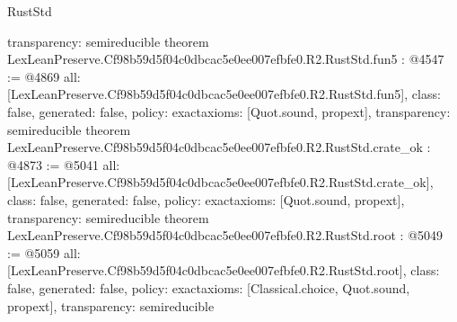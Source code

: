 \begin{lexlean}{RustStd}
\begin{coremodule}
{  transparency: semireducible
}
theorem LexLeanPreserve.Cf98b59d5f04c0dbcac5e0ee007efbfe0.R2.RustStd.fun5 : @4547 := @4869 {
  all: [LexLeanPreserve.Cf98b59d5f04c0dbcac5e0ee007efbfe0.R2.RustStd.fun5],
  class: false,
  generated: false,
  policy: exact{axioms: [Quot.sound, propext]},
  transparency: semireducible
}
theorem LexLeanPreserve.Cf98b59d5f04c0dbcac5e0ee007efbfe0.R2.RustStd.crate_ok : @4873 := @5041 {
  all: [LexLeanPreserve.Cf98b59d5f04c0dbcac5e0ee007efbfe0.R2.RustStd.crate_ok],
  class: false,
  generated: false,
  policy: exact{axioms: [Quot.sound, propext]},
  transparency: semireducible
}
theorem LexLeanPreserve.Cf98b59d5f04c0dbcac5e0ee007efbfe0.R2.RustStd.root : @5049 := @5059 {
  all: [LexLeanPreserve.Cf98b59d5f04c0dbcac5e0ee007efbfe0.R2.RustStd.root],
  class: false,
  generated: false,
  policy: exact{axioms: [Classical.choice, Quot.sound, propext]},
  transparency: semireducible
}


\end{coremodule}
\end{lexlean}
